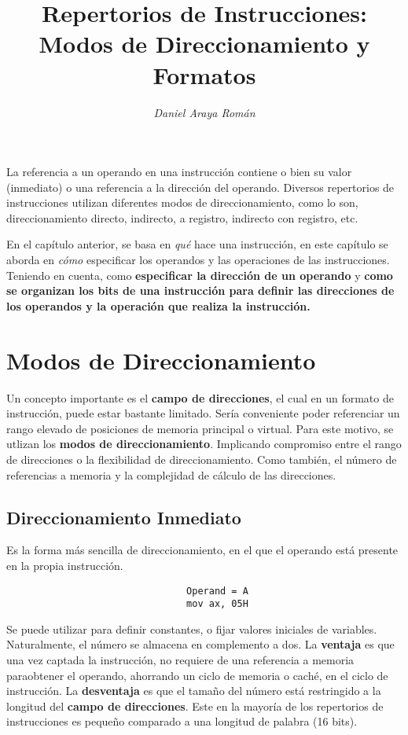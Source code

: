 \documentclass{article}
\title{\LARGE\textbf{Repertorios de Instrucciones: \\ 
                     Modos de Direccionamiento y Formatos}}
\author{\large\textit{Daniel Araya Román}}
\date{}
\begin{document}
\maketitle

La referencia a un operando en una instrucci\'{o}n contiene o bien
su valor (inmediato) o una referencia a la direcci\'{o}n del operando.
Diversos repertorios de instrucciones utilizan diferentes modos de
direccionamiento, como lo son, direccionamiento directo, indirecto,
a registro, indirecto con registro, etc.

En el cap\'{i}tulo anterior, se basa en \textit{qu\'{e}} hace una instrucci\'{o}n,
en este cap\'{i}tulo se aborda en \textit{c\'{o}mo} especificar los operandos
y las operaciones de las instrucciones. Teniendo en cuenta, como
\textbf{especificar la direcci\'{o}n de un operando} y
\textbf{como se organizan los bits de una instrucci\'{o}n para definir
las direcciones de los operandos y la operaci\'{o}n que realiza la
instrucci\'{o}n.} \cite{stallings2006organización}

\section*{Modos de Direccionamiento}
Un concepto importante es el \textbf{campo de direcciones}, el cual
en un formato de instrucci\'{o}n, puede estar bastante limitado. Ser\'{i}a
conveniente poder referenciar un rango elevado de posiciones de memoria
principal o virtual. Para este motivo, se utlizan los \textbf{modos de
    direccionamiento}. Implicando compromiso entre el rango de direcciones o
la flexibilidad de direccionamiento. Como tambi\'{e}n, el n\'{u}mero de
referencias a memoria y la complejidad  de c\'{a}lculo de las direcciones.

\subsection*{Direccionamiento Inmediato}
Es la forma m\'{a}s sencilla de direccionamiento, en el que el operando est\'{a}
presente en la propia instrucci\'{o}n.
\begin{verbatim}
                                Operand = A
                                mov ax, 05H
\end{verbatim}

Se puede utilizar para definir constantes, o fijar valores iniciales de variables.
Naturalmente, el n\'{u}mero se almacena en complemento a dos. La \textbf{ventaja}
es que una vez captada la instrucci\'{o}n, no requiere de una referencia a
memoria paraobtener el operando, ahorrando un ciclo de memoria o cach\'{e},
en el ciclo de instrucci\'{o}n. La \textbf{desventaja} es que el tama\~{n}o
del n\'{u}mero est\'{a} restringido a la longitud del
\textbf{campo de direcciones}. Este en la mayor\'{i}a de los repertorios de
instrucciones es peque\~{n}o comparado a una longitud de palabra (16 bits).
\end{document}
